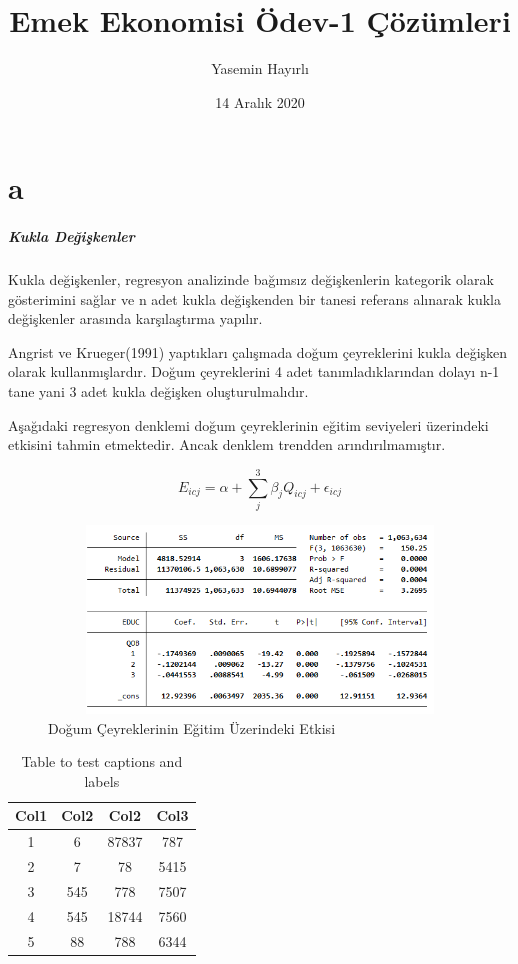 \documentclass[12pt, a4paper, showtrims]{article}
\begin{document}
\title{Emek Ekonomisi Ödev-1 Çözümleri}
\author{Yasemin Hayırlı}
\date{14 Aralık 2020}
\maketitle

\section{a}
\subparagraph*{Kukla Değişkenler} 
\begin{justify}
Kukla değişkenler, regresyon analizinde bağımsız değişkenlerin
kategorik olarak gösterimini sağlar ve n adet kukla değişkenden bir tanesi 
referans alınarak kukla değişkenler arasında karşılaştırma yapılır. 
    
Angrist ve Krueger(1991) yaptıkları çalışmada doğum çeyreklerini kukla 
değişken olarak kullanmışlardır. Doğum çeyreklerini 4 adet tanımladıklarından 
dolayı n-1 tane yani 3 adet kukla değişken oluşturulmalıdır.

Aşağıdaki regresyon denklemi doğum çeyreklerinin eğitim seviyeleri üzerindeki etkisini
tahmin etmektedir. Ancak denklem trendden arındırılmamıştır.

\[ E_{icj} = \alpha + \sum_{j}^{3}\beta_jQ_{icj} + \epsilon_{icj}  \]
\begin{figure}[h]
    \caption{Doğum Çeyreklerinin Eğitim Üzerindeki Etkisi}
    \includegraphics[width=14cm, height=5cm]{dummy_var_1.png}
    \centering
\end{figure}

\begin{table}[h!]
    \centering
    \caption{Table to test captions and labels}
    \begin{tabular}{||c c c c||} 
     \hline
     Col1 & Col2 & Col2 & Col3 \\ [0.5ex] 
     \hline\hline
     1 & 6 & 87837 & 787 \\ 
     2 & 7 & 78 & 5415 \\
     3 & 545 & 778 & 7507 \\
     4 & 545 & 18744 & 7560 \\
     5 & 88 & 788 & 6344 \\ [1ex] 
     \hline
    \end{tabular}
    

\end{table}
\end{justify}
\end{document}

